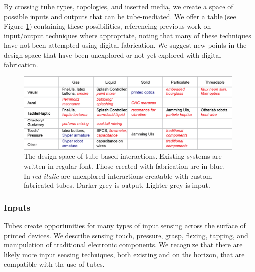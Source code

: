 By crossing tube types, topologies, and inserted media, we create a space of possible inputs and outputs that can be tube-mediated.  We offer a table (see Figure \ref{fig:designspace}) containing these possibilities, referencing previous work on input/output techniques where appropriate, noting that many of these techniques have not been attempted using digital fabrication.  We suggest new points in the design space that have been unexplored or not yet explored with digital fabrication.

\begin{figure}[t]
\centering
    \includegraphics[width=\textwidth]{figures/designspace.png}
\caption{The design space of tube-based interactions.  Existing systems are written in regular font.  Those created with fabrication are in {\color{blue}blue}. In \emph{{\color{red}red italic}} are unexplored interactions creatable with custom-fabricated tubes.  Darker grey is output.  Lighter grey is input.  }
\label{fig:designspace}
\end{figure}

\subsubsection{Inputs}

Tubes create opportunities for many types of input sensing across the surface of printed devices.  We describe sensing touch, pressure, grasp, flexing, tapping, and manipulation of traditional electronic components.  We recognize that there are likely more input sensing techniques, both existing and on the horizon, that are compatible with the use of tubes.

